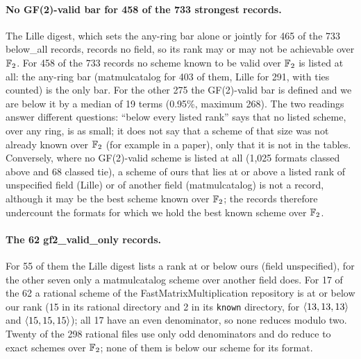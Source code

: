 \paragraph{No GF(2)-valid bar for 458 of the 733 strongest records.}
The Lille digest, which sets the any-ring bar alone or jointly for 465 of the 733 \textsf{below\_all} records, records no field, so its rank may or may not be achievable over ${\mathbb{F}_2}$. For 458 of the 733 records no scheme known to be valid over ${\mathbb{F}_2}$ is listed at all: the any-ring bar (matmulcatalog for 403 of them, Lille for 291, with ties counted) is the only bar.
For the other 275 the GF(2)-valid bar is defined and we are below it by a median of 19 terms (0.95\%, maximum 268). The two readings answer different questions: ``below every listed rank'' says that no listed scheme, over any ring, is as small; it does not say that a scheme of that size was not already known over ${\mathbb{F}_2}$ (for example in a paper), only that it is not in the tables.
Conversely, where no GF(2)-valid scheme is listed at all (1{,}025 formats classed \textsf{above} and 68 classed \textsf{tie}), a scheme of ours that lies at or above a listed rank of unspecified field (Lille) or of another field (matmulcatalog) is not a record, although it may be the best scheme known over ${\mathbb{F}_2}$; the records therefore undercount the formats for which we hold the best known scheme over ${\mathbb{F}_2}$.

\paragraph{The 62 \textsf{gf2\_valid\_only} records.}
For 55 of them the Lille digest lists a rank at or below ours (field unspecified), for the other seven only a matmulcatalog scheme over another field does. For 17 of the 62 a rational scheme of the FastMatrixMultiplication repository is at or below our rank (15 in its rational directory and 2 in its \texttt{known} directory, for $\langle 13,13,13\rangle$ and $\langle 15,15,15\rangle$); all 17 have an even denominator, so none reduces modulo two.
Twenty of the 298 rational files use only odd denominators and do reduce to exact schemes over ${\mathbb{F}_2}$; none of them is below our scheme for its format.

